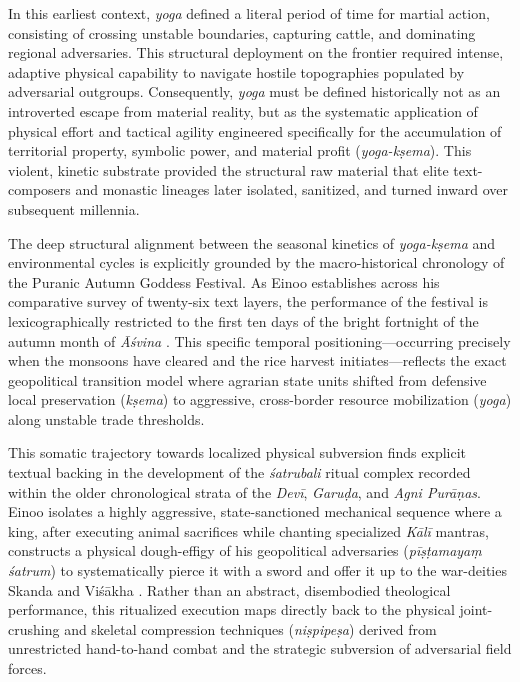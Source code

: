 \documentclass[11pt,twoside,letterpaper]{article}
\begin{document}
In this earliest context, \textit{yoga} defined a literal period of time for martial action, consisting of crossing unstable boundaries, capturing cattle, and dominating regional adversaries. This structural deployment on the frontier required intense, adaptive physical capability to navigate hostile topographies populated by adversarial outgroups. Consequently, \textit{yoga} must be defined historically not as an introverted escape from material reality, but as the systematic application of physical effort and tactical agility engineered specifically for the accumulation of territorial property, symbolic power, and material profit (\textit{yoga-kṣema}). This violent, kinetic substrate provided the structural raw material that elite text-composers and monastic lineages later isolated, sanitized, and turned inward over subsequent millennia.

The deep structural alignment between the seasonal kinetics of \textit{yoga-kṣema} and environmental cycles is explicitly grounded by the macro-historical chronology of the Puranic Autumn Goddess Festival. As Einoo establishes across his comparative survey of twenty-six text layers, the performance of the festival is lexicographically restricted to the first ten days of the bright fortnight of the autumn month of \textit{Āśvina} \citep{Einoo1999}. This specific temporal positioning—occurring precisely when the monsoons have cleared and the rice harvest initiates—reflects the exact geopolitical transition model where agrarian state units shifted from defensive local preservation (\textit{kṣema}) to aggressive, cross-border resource mobilization (\textit{yoga}) along unstable trade thresholds.

This somatic trajectory towards localized physical subversion finds explicit textual backing in the development of the \textit{śatrubali} ritual complex recorded within the older chronological strata of the \textit{Devī}, \textit{Garuḍa}, and \textit{Agni Purāṇas}. Einoo isolates a highly aggressive, state-sanctioned mechanical sequence where a king, after executing animal sacrifices while chanting specialized \textit{Kālī} mantras, constructs a physical dough-effigy of his geopolitical adversaries (\textit{pīṣṭamayaṃ śatrum}) to systematically pierce it with a sword and offer it up to the war-deities Skanda and Viśākha \citep{Einoo1999}. Rather than an abstract, disembodied theological performance, this ritualized execution maps directly back to the physical joint-crushing and skeletal compression techniques (\textit{niṣpipeṣa}) derived from unrestricted hand-to-hand combat and the strategic subversion of adversarial field forces.
\end{document}

